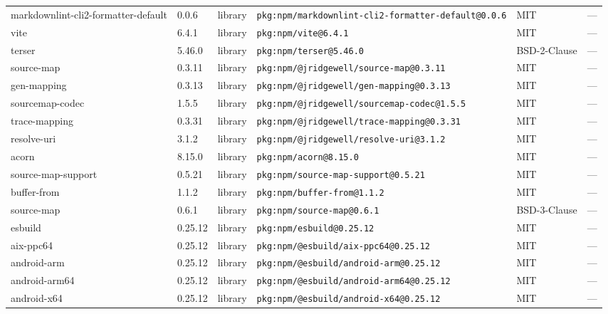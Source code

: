 \documentclass[11pt,a4paper]{article}
\begin{document}
\begin{longtable}{|p{4cm}|p{2cm}|p{1.6cm}|p{5cm}|p{1.5cm}|p{3.5cm}|}
\raggedright markdownlint-cli2-formatter-default & 0.0.6 & library & \small\texttt{pkg:npm/markdownlint-cli2-formatter-default@0.0.6} & MIT & \small — \\
\raggedright vite & 6.4.1 & library & \small\texttt{pkg:npm/vite@6.4.1} & MIT & \small — \\
\raggedright terser & 5.46.0 & library & \small\texttt{pkg:npm/terser@5.46.0} & BSD-2-Clause & \small — \\
\raggedright source-map & 0.3.11 & library & \small\texttt{pkg:npm/@jridgewell/source-map@0.3.11} & MIT & \small — \\
\raggedright gen-mapping & 0.3.13 & library & \small\texttt{pkg:npm/@jridgewell/gen-mapping@0.3.13} & MIT & \small — \\
\raggedright sourcemap-codec & 1.5.5 & library & \small\texttt{pkg:npm/@jridgewell/sourcemap-codec@1.5.5} & MIT & \small — \\
\raggedright trace-mapping & 0.3.31 & library & \small\texttt{pkg:npm/@jridgewell/trace-mapping@0.3.31} & MIT & \small — \\
\raggedright resolve-uri & 3.1.2 & library & \small\texttt{pkg:npm/@jridgewell/resolve-uri@3.1.2} & MIT & \small — \\
\raggedright acorn & 8.15.0 & library & \small\texttt{pkg:npm/acorn@8.15.0} & MIT & \small — \\
\raggedright source-map-support & 0.5.21 & library & \small\texttt{pkg:npm/source-map-support@0.5.21} & MIT & \small — \\
\raggedright buffer-from & 1.1.2 & library & \small\texttt{pkg:npm/buffer-from@1.1.2} & MIT & \small — \\
\raggedright source-map & 0.6.1 & library & \small\texttt{pkg:npm/source-map@0.6.1} & BSD-3-Clause & \small — \\
\raggedright esbuild & 0.25.12 & library & \small\texttt{pkg:npm/esbuild@0.25.12} & MIT & \small — \\
\raggedright aix-ppc64 & 0.25.12 & library & \small\texttt{pkg:npm/@esbuild/aix-ppc64@0.25.12} & MIT & \small — \\
\raggedright android-arm & 0.25.12 & library & \small\texttt{pkg:npm/@esbuild/android-arm@0.25.12} & MIT & \small — \\
\raggedright android-arm64 & 0.25.12 & library & \small\texttt{pkg:npm/@esbuild/android-arm64@0.25.12} & MIT & \small — \\
\raggedright android-x64 & 0.25.12 & library & \small\texttt{pkg:npm/@esbuild/android-x64@0.25.12} & MIT & \small — \\

\end{longtable}
\end{document}
